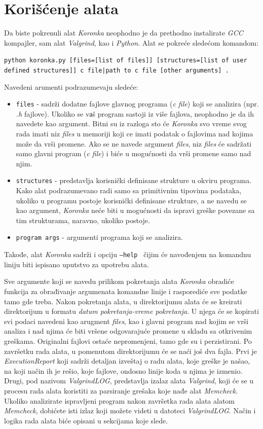 \documentclass[12pt,oneside]{memoir}
\theoremstyle{plain}
\theoremstyle{definition}
\begin{document}
\section{Korišćenje alata}
Da biste pokrenuli alat \textit{Koronka} neophodno je da prethodno instalirate \textit{GCC} kompajler, sam alat \textit{Valgrind}, kao i \textit{Python}. Alat se pokreće sledećom komandom:
\begin{center}
\texttt{python koronka.py [files=[list of files]] [structures=[list of user defined structures]] c file|path to c file [other arguments] .}
\end{center}
Navedeni arumenti podrazumevaju sledeće:
\begin{itemize}
\item \texttt{files} - sadrži dodatne fajlove glavnog programa (\textit{c file}) koji se analizira (npr. \textit{.h} fajlove). Ukoliko se vаš program sastoji iz više fajlova, neophodno je da ih navedete kao argument. Bitni su iz razloga sto će \textit{Koronka} svo vreme svog rada imati niz \textit{files} u memoriji koji ce imati podatak o fajlovima nad kojima može da vrši promene. Ako se ne navede argument \textit{files}, niz \textit{files} će sadržati samo glavni program (\textit{c file}) i biće u mogućnosti da vrši promene samo nad njim.
\item \texttt{structures} - predstavlja korisnički definisane strukture u okviru programa. Kako alat podrazumevano radi samo sa primitivnim tipovima podataka, ukoliko u programu postoje korisnički definisane strukture, a ne navedu se kao argument, \textit{Koronka} neće biti u mogućnosti da ispravi greške povezane sa tim strukturama, naravno, ukoliko postoje.
\item \texttt{program args} - argumenti programa koji se analizira.
\end{itemize}

Takođe, alat \textit{Koronka} sadrži i opciju \texttt{--help } čijim će navođenjem na komandnu liniju biti ispisano uputstvo za upotrebu alata. 

Sve argumente koji se navedu prilikom pokretanja alata \textit{Koronka} obradiće funkcija za obrađivanje argumenata komandne linije i rasporediće sve podatke tamo gde treba. Nakon pokretanja alata, u direktorijumu alata će se kreirati direktorijum u formatu \textit{datum pokretanja-vreme pokretanja}. U njega će se kopirati svi podaci navedeni kao arugment \textit{files}, kao i glavni program nad kojim se vrši analiza i nad njima će biti vršene odgovarajuće promene u skladu sa otkrivenim greškama. Originalni fajlovi ostaće nepromenjeni, tamo gde su i perzistirani. Po završetku rada alata, u pomenutom direktorijumu će se naći još dva fajla. Prvi je \textit{ExecutionReport} koji sadrži detaljan izveštaj o radu alata, koje greške je našao, na koji način ih je rešio, koje fajlove, ondosno linije koda u njima je izmenio. Drugi, pod nazivom \textit{ValgrindLOG}, predstavlja izalaz alata \textit{Valgrind}, koji će se u procesu rada alata koristiti za parsiranje grešaka koje nađe alat \textit{Memcheck}. Ukoliko analizirate ispravljeni program nakon završetka rada alata alatom \textit{Memcheck}, dobićete isti izlaz koji možete videti u datoteci \textit{ValgrindLOG}. Način i logika rada alata biće opisani u sekcijama koje slede.
\end{document}
